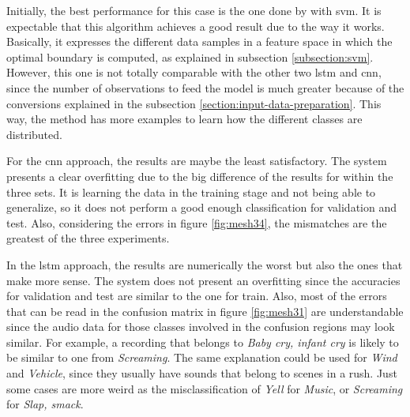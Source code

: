 	\begin{table}[h!]
		\begin{center}
		\end{center}
		\caption{Accuracy results for the three different algorithms and the three sets for the multiclass approach}
		\label{table:9}
	\end{table}

	Initially, the best performance for this case is the one done by with \acrshort{svm}. It is expectable that this algorithm achieves a good result due to the way it works. Basically, it expresses the different data samples in a feature space in which the optimal boundary is computed, as explained in subsection \ref{subsection:svm}. However, this one is not totally comparable with the other two \acrshort{lstm} and \acrshort{cnn}, since the number of observations to feed the model is much greater because of the conversions explained in the subsection \ref{section:input-data-preparation}. This way, the method has more examples to learn how the different classes are distributed.
	
	For the \acrshort{cnn} approach, the results are maybe the least satisfactory. The system presents a clear overfitting due to the big difference of the results for within the three sets. It is learning the data in the training stage and not being able to generalize, so it does not perform a good enough classification for validation and test. Also, considering the errors in figure \ref{fig:mesh34}, the mismatches are the greatest of the three experiments.
	
	In the \acrshort{lstm} approach, the results are numerically the worst but also the ones that make more sense. The system does not present an overfitting since the accuracies for validation and test are similar to the one for train. Also, most of the errors that can be read in the confusion matrix in figure \ref{fig:mesh31} are understandable since the audio data for those classes involved in the confusion regions may look similar. For example, a recording that belongs to \textit{Baby cry, infant cry} is likely to be similar to one from \textit{Screaming}. The same explanation could be used for \textit{Wind} and \textit{Vehicle}, since they usually have sounds that belong to scenes in a rush. Just some cases are more weird as the misclassification of \textit{Yell} for \textit{Music}, or \textit{Screaming} for \textit{Slap, smack}.
	
